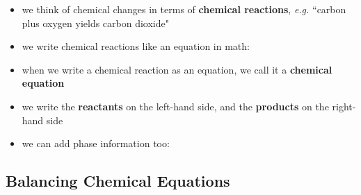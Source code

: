 \documentclass[11pt, oneside]{article}   	%
\begin{document}
\begin{itemize}
\item we think of chemical changes in terms of \textbf{chemical reactions}, \emph{e.g.} ``carbon plus oxygen yields carbon dioxide"
\item we write chemical reactions like an equation in math: 
\begin{center}
\end{center}
\item when we write a chemical reaction as an equation, we call it a \textbf{chemical equation}
\item we write the \textbf{reactants} on the left-hand side, and the \textbf{products} on the right-hand side
\item we can add phase information too: 
\begin{center}
\end{center}
\end{itemize}

\subsection{Balancing Chemical Equations}
\end{document}
